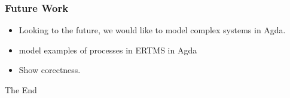 \documentclass{beamer}
\begin{document}
\begin{frame}[fragile] 
\frametitle{Future Work }

\begin{itemize}
\item Looking to the future, we would like to model complex systems in Agda.
\item model examples of processes in ERTMS in Agda 
\item Show corectness. 
\end{itemize}

	

\end{frame}










\begin{frame}
\Huge{\centerline{The End}}
\end{frame}
\end{document}
